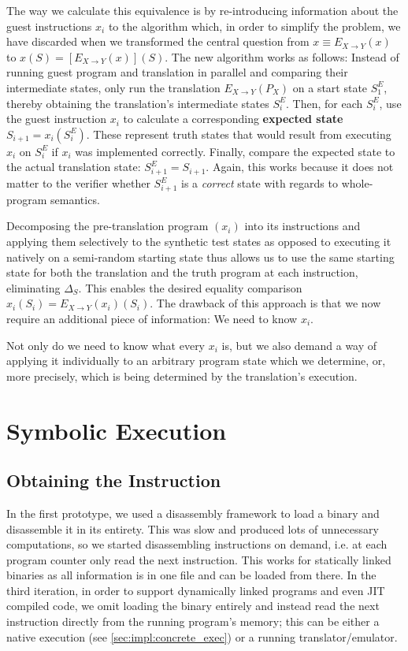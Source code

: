 The way we calculate this equivalence is by re-introducing information about the guest instructions $x_i$ to the
algorithm which, in order to simplify the problem, we have discarded when we transformed the central question from $x
\equiv E_{X \rightarrow Y}(x)$ to $x(S) = [E_{X \rightarrow Y}(x)](S)$. The new algorithm works as follows: Instead of
running guest program and translation in parallel and comparing their intermediate states, only run the translation
$E_{X \rightarrow Y}(P_X)$ on a start state $S^E_1$, thereby obtaining the translation's intermediate states $S^E_i$.
Then, for each $S^E_i$, use the guest instruction $x_i$ to calculate a corresponding \textbf{expected state} $S_{i+1} =
x_i(S^E_i)$. These represent truth states that would result from executing $x_i$ on $S^E_i$ if $x_i$ was implemented
correctly. Finally, compare the expected state to the actual translation state: $S^E_{i+1} = S_{i+1}$. Again, this works
because it does not matter to the verifier whether $S^E_{i+1}$ is a \textit{correct} state with regards to whole-program
semantics.

Decomposing the pre-translation program $(x_i)$ into its instructions and applying them selectively to the synthetic
test states as opposed to executing it natively on a semi-random starting state thus allows us to use the same starting
state for both the translation and the truth program at each instruction, eliminating $\Delta_S$. This enables the
desired equality comparison $x_i(S_i) = E_{X \rightarrow Y}(x_i)(S_i)$. The drawback of this approach is that we now
require an additional piece of information: We need to know $x_i$.

Not only do we need to know what every $x_i$ is, but we also demand a way of applying it individually to an arbitrary
program state which we determine, or, more precisely, which is being determined by the translation's execution.

\section{Symbolic Execution}

\subsection{Obtaining the Instruction}

In the first prototype, we used a disassembly framework to load a binary and disassemble it in its entirety. This was
slow and produced lots of unnecessary computations, so we started disassembling instructions on demand, i.e. at each
program counter only read the next instruction. This works for statically linked binaries as all information is in one
file and can be loaded from there. In the third iteration, in order to support dynamically linked programs and even
\ac{JIT} compiled code, we omit loading the binary entirely and instead read the next instruction directly from the
running program's memory; this can be either a native execution (see \ref{sec:impl:concrete_exec}) or a running
translator/emulator.

